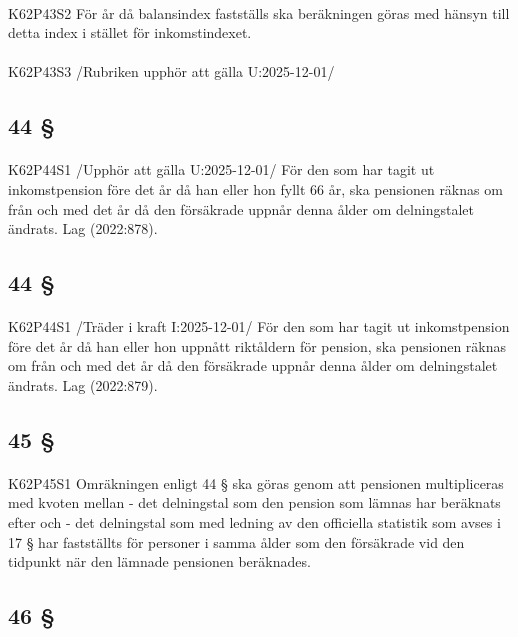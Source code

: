 \documentclass[a4paper,notitlepage,openany,10pt]{book}
\begin{document}
\paragraph*{}
{\tiny K62P43S2}
För år då balansindex fastställs ska beräkningen göras med hänsyn till detta index i stället för inkomstindexet.
\paragraph*{}
{\tiny K62P43S3}
/Rubriken upphör att gälla U:2025-12-01/
\subsection*{44 §}
\paragraph*{}
{\tiny K62P44S1}
/Upphör att gälla U:2025-12-01/
För den som har tagit ut inkomstpension före det år då han eller hon fyllt 66 år, ska pensionen räknas om från och med det år då den försäkrade uppnår denna ålder om delningstalet ändrats.
Lag (2022:878).
\subsection*{44 §}
\paragraph*{}
{\tiny K62P44S1}
/Träder i kraft I:2025-12-01/
För den som har tagit ut inkomstpension före det år då han eller hon uppnått riktåldern för pension, ska pensionen räknas om från och med det år då den försäkrade uppnår denna ålder om delningstalet ändrats.
Lag (2022:879).
\subsection*{45 §}
\paragraph*{}
{\tiny K62P45S1}
Omräkningen enligt 44 § ska göras genom att pensionen multipliceras med kvoten mellan
\newline - det delningstal som den pension som lämnas har beräknats efter och
\newline - det delningstal som med ledning av den officiella statistik som avses i 17 § har fastställts för personer i samma ålder som den försäkrade vid den tidpunkt när den lämnade pensionen beräknades.
\subsection*{46 §}
\end{document}
